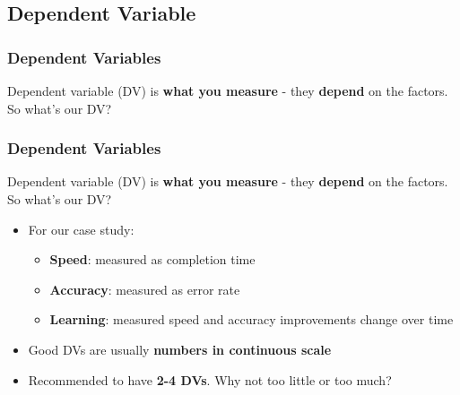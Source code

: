 \documentclass{beamer}
\begin{document}

\subsection{Dependent Variable}

\begin{frame}
\frametitle{Dependent Variables}
Dependent variable (DV) is \textbf{what you measure} - they \textbf{depend} on the factors.  So what's our DV?
\end{frame}

\begin{frame}
\frametitle{Dependent Variables}
Dependent variable (DV) is \textbf{what you measure} - they \textbf{depend} on the factors.  So what's our DV?
\begin{itemize}
	\item For our case study:
	\begin{itemize}
		\item \textbf{Speed}: measured as completion time
		\item \textbf{Accuracy}: measured as error rate
		\item \textbf{Learning}: measured speed and accuracy improvements change over time
	\end{itemize}
	\item Good DVs are usually \textbf{numbers in continuous scale}
	\item Recommended to have \textbf{2-4 DVs}.  Why not too little or too much?
\end{itemize}
\end{frame}
\end{document}
